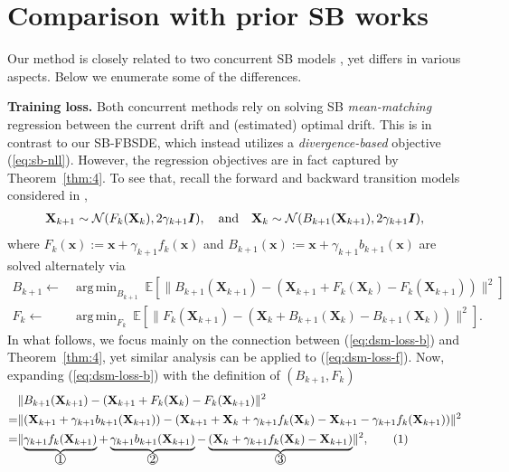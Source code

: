 \documentclass{article}
\def\eqref#1{(\ref{#1})}
\def\rvX{{\mathbf{X}}}
\def\vx{{\bm{x}}}
\def\mI{{\bm{I}}}
\newcommand{\E}{\mathbb{E}}
\DeclareMathOperator*{\argmin}{arg\,min}
\newcommand{\norm}[1]{\lVert#1\rVert}
\def\calN{{\cal N}}
\newcommand{\br}[1]{\left[#1\right]}
\newcommand{\pr}[1]{\left(#1\right)}
\newcommand\numberthis{\addtocounter{equation}{1}\tag{\theequation}}
\newcommand*\numcircledmod[1]{\raisebox{.5pt}{\textcircled{\raisebox{-.9pt} {#1}}}}
\begin{document}
 
\section{Comparison with prior SB works}\label{app:d2}

Our method is closely related to two concurrent SB models \citep{de2021diffusion,vargas2021solving},
yet differs in various aspects. Below we enumerate some of the differences.

\textbf{Training loss.}
  Both concurrent methods rely on solving SB \textit{mean-matching} regression between the current drift and (estimated) optimal drift.
  This is in contrast to our {SB-FBSDE}, which instead utilizes a \textit{divergence-based} objective \eqref{eq:sb-nll}.
  However, the regression objectives are in fact captured by Theorem~\ref{thm:4}.
  To see that, recall the forward and backward transition models considered in \citet{de2021diffusion},
    \begin{align*}
        \rvX_{k+1}\sim\calN(F_k(\rvX_k), 2\gamma_{k+1}\mI), \quad \text{and} \quad
        \rvX_{k}\sim\calN(B_{k+1}(\rvX_{k+1}), 2\gamma_{k+1}\mI),
    \end{align*}
  where $F_k(\vx) := \vx + \gamma_{k+1}f_k(\vx)$ and
    $B_{k+1}(\vx) := \vx + \gamma_{k+1}b_{k+1}(\vx)$
  are solved alternately via
  \begin{subequations}
  \begin{align}
       B_{k+1} \leftarrow &\argmin_{B_{k+1}}~\E\br{ \norm{
            B_{k+1}(\rvX_{k+1}) - (\rvX_{k+1} + F_k(\rvX_k) - F_{k}(\rvX_{k+1}) )
       }^2 } \label{eq:dsm-loss-b} \\
       F_{k}   \leftarrow &\argmin_{F_{k}}~\E\br{ \norm{
            F_{k}(\rvX_{k+1}) - (\rvX_{k} + B_{k+1}(\rvX_k) - B_{k+1}(\rvX_{k}) )
       }^2 }. \label{eq:dsm-loss-f}
  \end{align} \label{eq:dsm-loss}\end{subequations}
  In what follows, we focus mainly on the connection between \eqref{eq:dsm-loss-b} and Theorem~\ref{thm:4}, yet similar analysis can be applied to \eqref{eq:dsm-loss-f}.
  Now, expanding \eqref{eq:dsm-loss-b} with the definition of $(B_{k+1},F_{k})$
    \begin{align*}
         & \norm{B_{k+1}(\rvX_{k+1}) - (\rvX_{k+1} + F_k(\rvX_k) - F_{k}(\rvX_{k+1})}^2 \\
        =& \norm{\pr{\rvX_{k+1} + \gamma_{k+1}b_{k+1}(\rvX_{k+1})}
                 - \pr{\rvX_{k+1} + \rvX_k + \gamma_{k+1}f_k(\rvX_k) - \rvX_{k+1} - \gamma_{k+1}f_k(\rvX_{k+1})}}^2\\
        =& \norm{
            \underbrace{\gamma_{k+1}f_k(\rvX_{k+1})}_{\numcircledmod{1}}
          + \underbrace{\gamma_{k+1}b_{k+1}(\rvX_{k+1})}_{\numcircledmod{2}}
          - \underbrace{\pr{\rvX_k + \gamma_{k+1}f_k(\rvX_k) - \rvX_{k+1}}}_{\numcircledmod{3}}
          }^2, \numberthis
    \end{align*}
\end{document}

